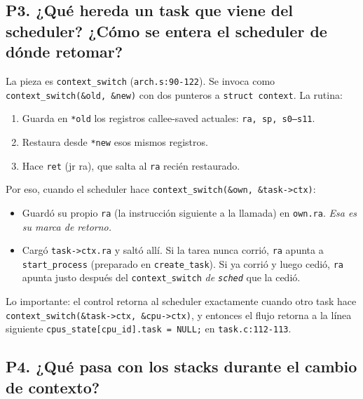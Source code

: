 \documentclass[11pt,a4paper]{article}
\begin{document}
\subsection*{P3. ¿Qué hereda un task que viene del scheduler? ¿Cómo se entera el scheduler de dónde retomar?}

\begin{respuesta}
La pieza es \texttt{context\_switch} (\texttt{arch.s:90-122}). Se
invoca como \texttt{context\_switch(\&old, \&new)} con dos punteros
a \texttt{struct context}. La rutina:

\begin{enumerate}[leftmargin=*,nosep]
    \item Guarda en \texttt{*old} los registros callee-saved
        actuales: \texttt{ra, sp, s0--s11}.
    \item Restaura desde \texttt{*new} esos mismos registros.
    \item Hace \texttt{ret} (jr ra), que salta al \texttt{ra}
        recién restaurado.
\end{enumerate}

Por eso, cuando el scheduler hace \texttt{context\_switch(\&own,
\&task->ctx)}:

\begin{itemize}[leftmargin=*,nosep]
    \item Guardó su propio \texttt{ra} (la instrucción siguiente a
        la llamada) en \texttt{own.ra}. \emph{Esa es su marca de
        retorno.}
    \item Cargó \texttt{task->ctx.ra} y saltó allí. Si la tarea
        nunca corrió, \texttt{ra} apunta a \texttt{start\_process}
        (preparado en \texttt{create\_task}). Si ya corrió y luego
        cedió, \texttt{ra} apunta justo después del
        \texttt{context\_switch} \emph{de \texttt{sched}} que la
        cedió.
\end{itemize}

Lo importante: el control retorna al scheduler exactamente cuando
otro task hace \texttt{context\_switch(\&task->ctx,
\&cpu->ctx)}, y entonces el flujo retorna a la línea siguiente
\texttt{cpus\_state[cpu\_id].task = NULL;} en
\texttt{task.c:112-113}.
\end{respuesta}

\subsection*{P4. ¿Qué pasa con los stacks durante el cambio de contexto?}
\end{document}
